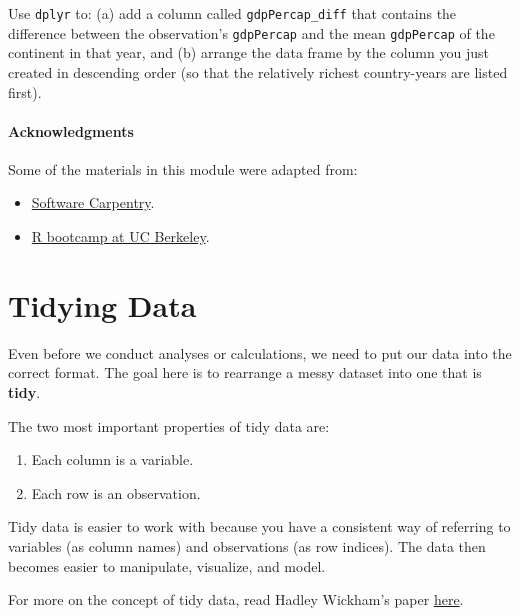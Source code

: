 \documentclass[
]{book}
\providecommand{\tightlist}{%
  \setlength{\itemsep}{0pt}\setlength{\parskip}{0pt}}
\begin{document}
Use \texttt{dplyr} to: (a) add a column called \texttt{gdpPercap\_diff} that contains the difference between the observation's \texttt{gdpPercap} and the mean \texttt{gdpPercap} of the continent in that year, and (b) arrange the data frame by the column you just created in descending order (so that the relatively richest country-years are listed first).

\hypertarget{acknowledgments-2}{%
\subsubsection*{Acknowledgments}\label{acknowledgments-2}}

Some of the materials in this module were adapted from:

\begin{itemize}
\tightlist
\item
  \href{http://swcarpentry.github.io/r-novice-gapminder/}{Software Carpentry}.
\item
  \href{https://github.com/berkeley-scf/r-bootcamp-fall-2019}{R bootcamp at UC Berkeley}.
\end{itemize}

\hypertarget{tidying-data}{%
\chapter{Tidying Data}\label{tidying-data}}

Even before we conduct analyses or calculations, we need to put our data into the correct format. The goal here is to rearrange a messy dataset into one that is \textbf{tidy}.

The two most important properties of tidy data are:

\begin{enumerate}
\def\labelenumi{\arabic{enumi})}
\tightlist
\item
  Each column is a variable.
\item
  Each row is an observation.
\end{enumerate}

Tidy data is easier to work with because you have a consistent way of referring to variables (as column names) and observations (as row indices). The data then becomes easier to manipulate, visualize, and model.

For more on the concept of tidy data, read Hadley Wickham's paper \href{http://vita.had.co.nz/papers/tidy-data.html}{here}.
\end{document}

